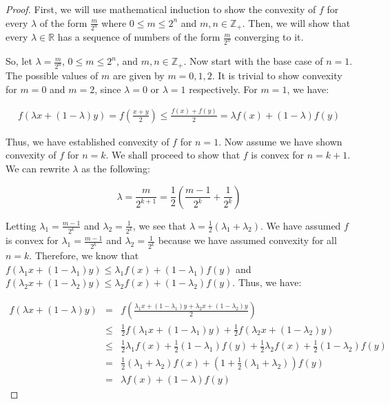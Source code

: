 \documentclass[psamsfonts]{amsart}
\theoremstyle{definition}
\theoremstyle{remark}
\numberwithin{equation}{section}
\begin{document}
\begin{proof}
First, we will use mathematical induction to show the convexity of $f$ for every $\lambda$ of the form $\frac{m}{2^n}$ where $0 \leq m \leq 2^n$ and $m,n \in \mathbb{Z}_+$. Then, we will show that every $\lambda \in \mathbb{R}$ has a sequence of numbers of the form $\frac{m}{2^n}$ converging to it. 

So, let $\lambda = \frac{m}{2^n}$, $0 \leq m \leq 2^n$, and $m,n \in \mathbb{Z}_{+}$. Now start with the base case of $n=1$. The possible values of $m$ are given by $m = 0,1,2$. It is trivial to show convexity for $m = 0$ and $m = 2$, since $\lambda = 0$ or $\lambda = 1$ respectively. For $m = 1$, we have:

\begin{eqnarray}
f(\lambda x + (1 - \lambda) y) = f \left(\frac{x + y}{2} \right) \leq \frac{f(x) + f(y)}{2} = \lambda f(x) + (1 - \lambda) f(y)
\end{eqnarray}

Thus, we have established convexity of $f$ for $n = 1$. Now assume we have shown convexity of $f$ for $n = k$. We shall proceed to show that $f$ is convex for $n = k+1$. We can rewrite $\lambda$ as the following:

\begin{equation}
\lambda = \frac{m}{2^{k+1}} = \frac{1}{2} \left( \frac{m-1}{2^k} + \frac{1}{2^k} \right)
\end{equation}

Letting $\lambda_1 = \frac{m-1}{2^k}$ and $\lambda_2 = \frac{1}{2^k}$, we see that $\lambda = \frac{1}{2}(\lambda_1 + \lambda_2)$. We have assumed $f$ is convex for $\lambda_1 = \frac{m-1}{2^k}$ and $\lambda_2 = \frac{1}{2^k}$ because we have assumed convexity for all $n = k$. Therefore, we know that $f(\lambda_1 x + (1 - \lambda_1) y ) \leq \lambda_1 f(x) + (1 - \lambda_1) f(y)$ and $f(\lambda_2 x + (1- \lambda_2)y ) \leq \lambda_2 f(x) + (1 - \lambda_2) f(y)$. Thus, we have:

\begin{eqnarray}
f(\lambda x + (1 - \lambda) y) &=& f \left(\frac{\lambda_1 x + (1 - \lambda_1) y + \lambda_2 x + (1 - \lambda_2) y}{2} \right) \\
&\leq& \frac{1}{2} f(\lambda_1 x + (1 - \lambda_1) y) + \frac{1}{2} f( \lambda_2 x + (1 - \lambda_2) y) \\
&\leq& \frac{1}{2} \lambda_1 f(x) + \frac{1}{2} ( 1- \lambda_1) f(y) + \frac{1}{2} \lambda_2 f(x) + \frac{1}{2} (1 - \lambda_2) f(y) \\
&=& \frac{1}{2} ( \lambda_1 + \lambda_2) f(x) + (1 + \frac{1}{2} (\lambda_1 + \lambda_2)) f(y) \\
&=& \lambda f(x) + (1 - \lambda) f(y)
\end{eqnarray}


\end{proof}
\end{document}

